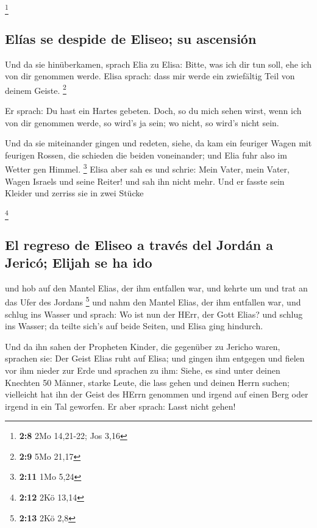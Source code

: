 \footnote{\textbf{2:8} 2Mo 14,21-22; Jos 3,16}

\hypertarget{eluxedas-se-despide-de-eliseo-su-ascensiuxf3n}{%
\subsection{Elías se despide de Eliseo; su
ascensión}\label{eluxedas-se-despide-de-eliseo-su-ascensiuxf3n}}

 Und da sie hinüberkamen, sprach Elia zu Elisa: Bitte, was
ich dir tun soll, ehe ich von dir genommen werde. Elisa sprach: dass mir
werde ein zwiefältig Teil von deinem Geiste. \footnote{\textbf{2:9} 5Mo
  21,17}

 Er sprach: Du hast ein Hartes gebeten. Doch, so du mich
sehen wirst, wenn ich von dir genommen werde, so wird's ja sein; wo
nicht, so wird's nicht sein.

 Und da sie miteinander gingen und redeten, siehe, da kam
ein feuriger Wagen mit feurigen Rossen, die schieden die beiden
voneinander; und Elia fuhr also im Wetter gen Himmel. \footnote{\textbf{2:11}
  1Mo 5,24}  Elisa aber sah es und schrie: Mein Vater,
mein Vater, Wagen Israels und seine Reiter! und sah ihn nicht mehr. Und
er fasste sein Kleider und zerriss sie in zwei Stücke

\footnote{\textbf{2:12} 2Kö 13,14}

\hypertarget{el-regreso-de-eliseo-a-travuxe9s-del-jorduxe1n-a-jericuxf3-elijah-se-ha-ido}{%
\subsection{El regreso de Eliseo a través del Jordán a Jericó; Elijah se
ha
ido}\label{el-regreso-de-eliseo-a-travuxe9s-del-jorduxe1n-a-jericuxf3-elijah-se-ha-ido}}

 und hob auf den Mantel Elias, der ihm entfallen war, und
kehrte um und trat an das Ufer des Jordans \footnote{\textbf{2:13} 2Kö
  2,8}  und nahm den Mantel Elias, der ihm entfallen war,
und schlug ins Wasser und sprach: Wo ist nun der HErr, der Gott Elias?
und schlug ins Wasser; da teilte sich's auf beide Seiten, und Elisa ging
hindurch.

 Und da ihn sahen der Propheten Kinder, die gegenüber zu
Jericho waren, sprachen sie: Der Geist Elias ruht auf Elisa; und gingen
ihm entgegen und fielen vor ihm nieder zur Erde  und
sprachen zu ihm: Siehe, es sind unter deinen Knechten 50 Männer, starke
Leute, die lass gehen und deinen Herrn suchen; vielleicht hat ihn der
Geist des HErrn genommen und irgend auf einen Berg oder irgend in ein
Tal geworfen. Er aber sprach: Lasst nicht gehen!

